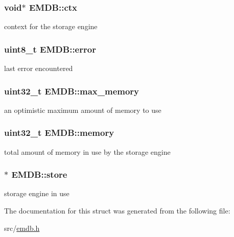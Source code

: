 \subsubsection[{ctx}]{\setlength{\rightskip}{0pt plus 5cm}void$\ast$ E\+M\+D\+B\+::ctx}\label{struct_e_m_d_b_a726fbe533f115c88e1afb228a9a19116}
context for the storage engine \hypertarget{struct_e_m_d_b_ae32927fa60a17d82bf46e33433054272}{}
\subsubsection[{error}]{\setlength{\rightskip}{0pt plus 5cm}uint8\+\_\+t E\+M\+D\+B\+::error}\label{struct_e_m_d_b_ae32927fa60a17d82bf46e33433054272}
last error encountered \hypertarget{struct_e_m_d_b_a6fe1b09bdf8d8e0095f63c7a5a8e857c}{}
\subsubsection[{max\+\_\+memory}]{\setlength{\rightskip}{0pt plus 5cm}uint32\+\_\+t E\+M\+D\+B\+::max\+\_\+memory}\label{struct_e_m_d_b_a6fe1b09bdf8d8e0095f63c7a5a8e857c}
an optimistic maximum amount of memory to use \hypertarget{struct_e_m_d_b_a0f1134b0c45750d0db8b9fd7efd10069}{}
\subsubsection[{memory}]{\setlength{\rightskip}{0pt plus 5cm}uint32\+\_\+t E\+M\+D\+B\+::memory}\label{struct_e_m_d_b_a0f1134b0c45750d0db8b9fd7efd10069}
total amount of memory in use by the storage engine \hypertarget{struct_e_m_d_b_a872289fb194a97cf2718c680a7cee154}{}
\subsubsection[{store}]{$\ast$ E\+M\+D\+B\+::store}\label{struct_e_m_d_b_a872289fb194a97cf2718c680a7cee154}
storage engine in use 

The documentation for this struct was generated from the following file\+:\begin{DoxyCompactItemize}
\item 
src/\hyperlink{emdb_8h}{emdb.\+h}\end{DoxyCompactItemize}
